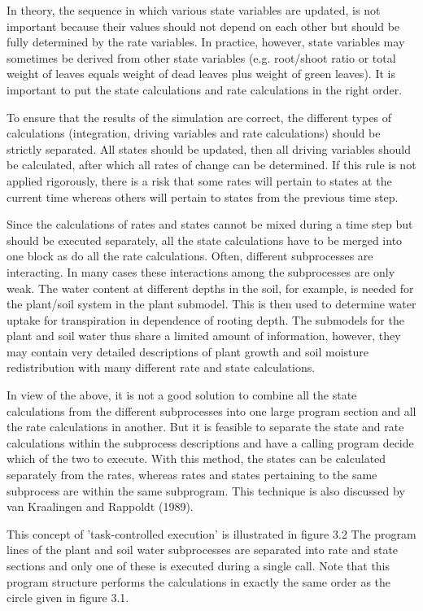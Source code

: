 \bigskip
\bigskip
In theory, the sequence in which various state variables are updated, is not important
because their values should not depend on each other but should be fully determined by
the rate variables. In practice, however, state variables may sometimes be derived from
other state variables (e.g. root/shoot ratio or total weight of leaves equals weight of dead
leaves plus weight of green leaves). It is important to put the state calcula\-tions and rate
calculations in the right order.

\bigskip
To ensure that the results of the simulation are correct, the different types of calculations
(integration, driving variables and rate calcula\-tions) should be strictly separated. All states
should be updated, then all driving variables should be calculat\-ed, after which all rates of
change can be determined. If this rule is not applied rigorous\-ly, there is a risk that some
rates will pertain to states at the current time whereas others will pertain to states from
the previous time step.

\bigskip
Since the calculations of rates and states cannot be mixed during a time step but should be
executed separately, all the state calculations have to be merged into one block as do all
the rate calculations. Often, different subprocesses are interacting. In many cases these
interactions among the subprocesses are only weak. The water content at different depths
in the soil, for example, is needed for the plant/soil system in the plant submodel. This is
then used to deter\-mine water uptake for transpiration in dependence of rooting depth. The
submodels for the plant and soil water thus share a limited amount of information,
however, they may contain very detailed descriptions of plant growth and soil moisture
redistribution with many different rate and state calcula\-tions.

\bigskip
In view of the above, it is not a good solution to combine all the state calculations from
the different subprocesses into one large program section and all the rate calculations in
another. But it is feasible to separate the state and rate calculations within the subprocess
descriptions and have a calling program decide which of the two to execute. With this
method, the states can be calculated separately from the rates, whereas rates and states
pertaining to the same subprocess are within the same subprogram. This technique is also
discussed by van Kraalingen and Rappoldt (1989).

\bigskip
This concept of 'task-controlled execution' is illustrated in figure 3.2 The program lines
of the plant and soil water subprocesses are separated into rate and state sections and only
one of these is executed during a single call. Note that this program structure performs
the calculations in exactly the same order as the circle given in figure 3.1.

